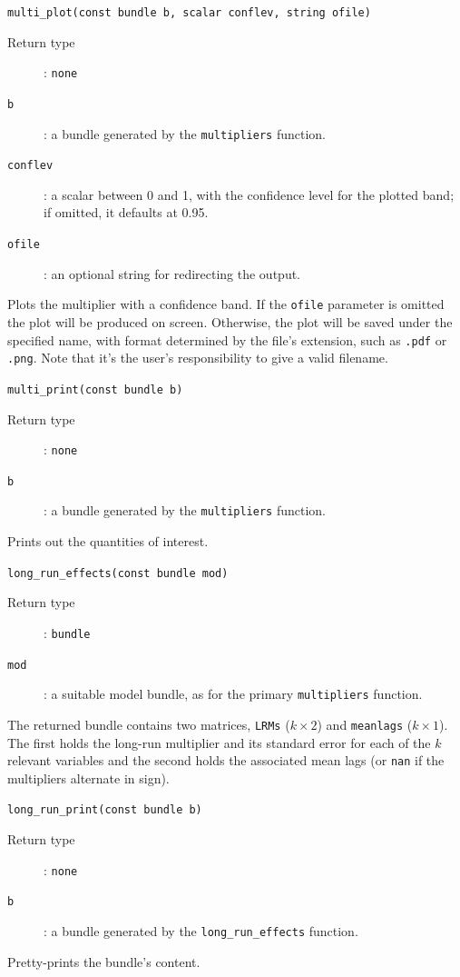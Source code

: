 \documentclass[a4paper,10pt]{article}
\newenvironment{funcdoc}[1]
{\noindent\hrulefill\newline\texttt{#1}\par\noindent\hrulefill\par\medskip\par}
{\bigskip}
\begin{document}
\begin{funcdoc}{multi\_plot(const bundle b, scalar conflev,
			 string ofile)}
  \begin{description}
  \item[Return type]: \texttt{none}
  \item[\texttt{b}]: a bundle generated by the \texttt{multipliers} function.
  \item[\texttt{conflev}]: a scalar between 0 and 1, with the
    confidence level for the plotted band; if omitted, it defaults at 0.95.
  \item[\texttt{ofile}]: an optional string for redirecting the output.
\end{description}
\noindent Plots the multiplier with a confidence band. If the
\texttt{ofile} parameter is omitted the plot will be produced on
screen. Otherwise, the plot will be saved under the specified name,
with format determined by the file's extension, such as \texttt{.pdf}
or \texttt{.png}. Note that it's the user's responsibility to give a
valid filename.  
\end{funcdoc}

\begin{funcdoc}{multi\_print(const bundle b)}
  \begin{description}
  \item[Return type]: \texttt{none}
  \item[\texttt{b}]: a bundle generated by the \texttt{multipliers} function.
\end{description}
\noindent Prints out the quantities of interest.
\end{funcdoc}

\begin{funcdoc}{long\_run\_effects(const bundle mod)}
  \begin{description}
  \item[Return type]: \texttt{bundle}
  \item[\texttt{mod}]: a suitable model bundle, as for the primary
    \texttt{multipliers} function.
  \end{description}
  \noindent The returned bundle contains two matrices, \texttt{LRMs}
  ($k \times 2$) and \texttt{meanlags} ($k \times 1$). The first holds
  the long-run multiplier and its standard error for each of the $k$
  relevant variables and the second holds the associated mean lags (or
  \texttt{nan} if the multipliers alternate in sign).
\end{funcdoc}

\begin{funcdoc}{long\_run\_print(const bundle b)}
  \begin{description}
  \item[Return type]: \texttt{none}
  \item[\texttt{b}]: a bundle generated by the \texttt{long\_run\_effects} function.
\end{description}
\noindent Pretty-prints the bundle's content.
\end{funcdoc}
\end{document}
